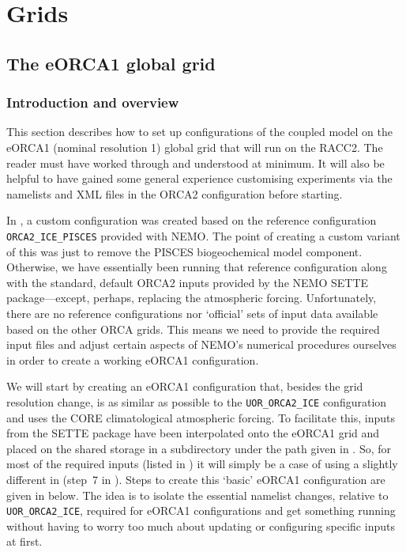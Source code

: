 \clearpage
\section{Grids}
\label{sec:grids}

\subsection{The eORCA1 global grid}
\label{sec:grids-eorca1}

\subsubsection{Introduction and overview}
\label{sec:grids-eorca1-intro}

This section describes how to set up configurations of the coupled \NEMOSIcu{} model on the eORCA1 (nominal resolution 1\textdegree{}) global grid that will run on the RACC2.
The reader must have worked through and understood  at minimum.
It will also be helpful to have gained some general experience customising experiments via the namelists and XML files in the ORCA2 configuration before starting.

In , a custom configuration was created based on the reference configuration \mbox{\texttt{ORCA2_ICE_PISCES}} provided with NEMO.
The point of creating a custom variant of this was just to remove the PISCES biogeochemical model component.
Otherwise, we have essentially been running that reference configuration along with the standard, default ORCA2 inputs provided by the NEMO SETTE package---except, perhaps, replacing the atmospheric forcing.
Unfortunately, there are no reference configurations nor `official' sets of input data available based on the other ORCA grids.
This means we need to provide the required input files and adjust certain aspects of NEMO's numerical procedures ourselves in order to create a working eORCA1 configuration.

We will start by creating an eORCA1 configuration that, besides the grid resolution change, is as similar as possible to the \mbox{\texttt{UOR_ORCA2_ICE}} configuration and uses the CORE climatological atmospheric forcing.
To facilitate this, inputs from the  SETTE package have been interpolated onto the eORCA1 grid and placed on the shared storage in a subdirectory  under the path given in .
So, for most of the required inputs (listed in ) it will simply be a case of using a slightly different  in  (step~7 in ).
Steps to create this `basic' eORCA1 configuration are given in  below.
The idea is to isolate the essential namelist changes, relative to \mbox{\texttt{UOR_ORCA2_ICE}}, required for eORCA1 configurations and get something running without having to worry too much about updating or configuring specific inputs at first.

